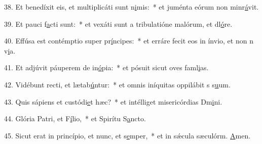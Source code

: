 38. Et benedíxit eis, et multiplicáti sunt n\uline{i}mis:~* et juménta eórum non minr\uline{á}vit.\par 
39. Et pauci f\uline{a}cti sunt:~* et vexáti sunt a tribulatióne malórum, et dl\uline{ó}re.\par 
40. Effúsa est contémptio super pr\uline{í}ncipes:~* et erráre fecit eos in ínvio, et non n v\uline{i}a.\par 
41. Et adjúvit páuperem de in\uline{ó}pia:~* et pósuit sicut oves faml\uline{i}as.\par 
42. Vidébunt recti, et lætab\uline{ú}ntur:~* et omnis iníquitas oppilábit s s\uline{u}um.\par 
43. Quis sápiens et custódi\uline{e}t hæc?~* et intélliget misericórdias Dm\uline{i}ni.\par 
44. Glória Patri, et F\uline{í}lio,~* et Spirítu S\uline{a}ncto.\par 
45. Sicut erat in princípio, et nunc, et s\uline{e}mper,~* et in sǽcula sæculórm. \uline{A}men.\par 
